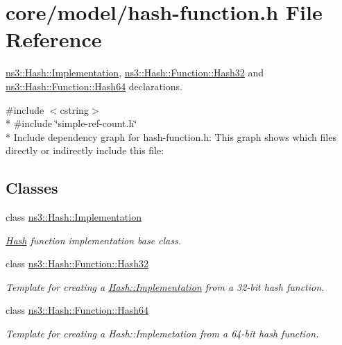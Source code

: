 \hypertarget{hash-function_8h}{}\section{core/model/hash-\/function.h File Reference}
\label{hash-function_8h}


\hyperlink{classns3_1_1Hash_1_1Implementation}{ns3\+::\+Hash\+::\+Implementation}, \hyperlink{classns3_1_1Hash_1_1Function_1_1Hash32}{ns3\+::\+Hash\+::\+Function\+::\+Hash32} and \hyperlink{classns3_1_1Hash_1_1Function_1_1Hash64}{ns3\+::\+Hash\+::\+Function\+::\+Hash64} declarations.  


{\ttfamily \#include $<$cstring$>$}\\*
{\ttfamily \#include \char`\"{}simple-\/ref-\/count.\+h\char`\"{}}\\*
Include dependency graph for hash-\/function.h\+:
This graph shows which files directly or indirectly include this file\+:
\subsection*{Classes}
\begin{DoxyCompactItemize}
\item 
class \hyperlink{classns3_1_1Hash_1_1Implementation}{ns3\+::\+Hash\+::\+Implementation}
\begin{DoxyCompactList}\small\item\em \hyperlink{namespacens3_1_1Hash}{Hash} function implementation base class. \end{DoxyCompactList}\item 
class \hyperlink{classns3_1_1Hash_1_1Function_1_1Hash32}{ns3\+::\+Hash\+::\+Function\+::\+Hash32}
\begin{DoxyCompactList}\small\item\em Template for creating a \hyperlink{classns3_1_1Hash_1_1Implementation}{Hash\+::\+Implementation} from a 32-\/bit hash function. \end{DoxyCompactList}\item 
class \hyperlink{classns3_1_1Hash_1_1Function_1_1Hash64}{ns3\+::\+Hash\+::\+Function\+::\+Hash64}
\begin{DoxyCompactList}\small\item\em Template for creating a Hash\+::\+Implemetation from a 64-\/bit hash function. \end{DoxyCompactList}\end{DoxyCompactItemize}
